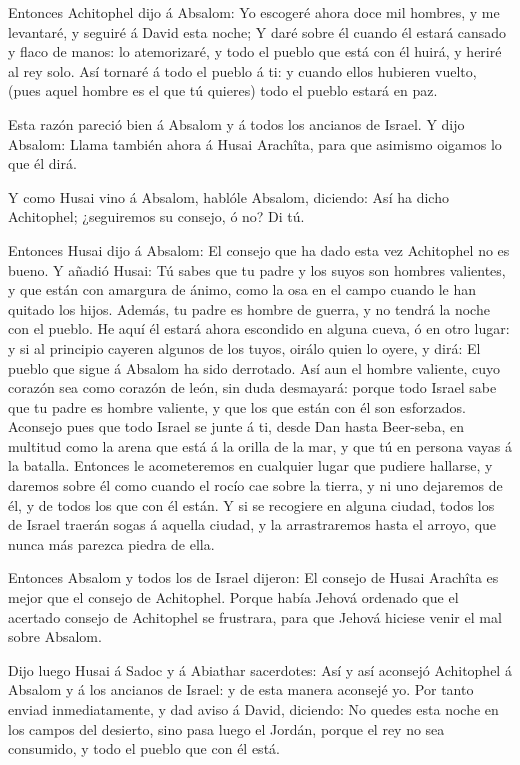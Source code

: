  Entonces Achitophel dijo á Absalom: Yo escogeré ahora doce
mil hombres, y me levantaré, y seguiré á David esta noche; 
Y daré sobre él cuando él estará cansado y flaco de manos: lo
atemorizaré, y todo el pueblo que está con él huirá, y heriré al rey
solo.  Así tornaré á todo el pueblo á ti: y cuando ellos
hubieren vuelto, (pues aquel hombre es el que tú quieres) todo el pueblo
estará en paz.

 Esta razón pareció bien á Absalom y á todos los ancianos de
Israel.  Y dijo Absalom: Llama también ahora á Husai
Arachîta, para que asimismo oigamos lo que él dirá.

 Y como Husai vino á Absalom, hablóle Absalom, diciendo: Así
ha dicho Achitophel; ¿seguiremos su consejo, ó no? Di tú.

 Entonces Husai dijo á Absalom: El consejo que ha dado esta
vez Achitophel no es bueno.  Y añadió Husai: Tú sabes que tu
padre y los suyos son hombres valientes, y que están con amargura de
ánimo, como la osa en el campo cuando le han quitado los hijos. Además,
tu padre es hombre de guerra, y no tendrá la noche con el pueblo.
 He aquí él estará ahora escondido en alguna cueva, ó en
otro lugar: y si al principio cayeren algunos de los tuyos, oirálo quien
lo oyere, y dirá: El pueblo que sigue á Absalom ha sido derrotado.
 Así aun el hombre valiente, cuyo corazón sea como corazón
de león, sin duda desmayará: porque todo Israel sabe que tu padre es
hombre valiente, y que los que están con él son esforzados.
 Aconsejo pues que todo Israel se junte á ti, desde Dan
hasta Beer-seba, en multitud como la arena que está á la orilla de la
mar, y que tú en persona vayas á la batalla.  Entonces le
acometeremos en cualquier lugar que pudiere hallarse, y daremos sobre él
como cuando el rocío cae sobre la tierra, y ni uno dejaremos de él, y de
todos los que con él están.  Y si se recogiere en alguna
ciudad, todos los de Israel traerán sogas á aquella ciudad, y la
arrastraremos hasta el arroyo, que nunca más parezca piedra de ella.

 Entonces Absalom y todos los de Israel dijeron: El consejo
de Husai Arachîta es mejor que el consejo de Achitophel. Porque había
Jehová ordenado que el acertado consejo de Achitophel se frustrara, para
que Jehová hiciese venir el mal sobre Absalom.

 Dijo luego Husai á Sadoc y á Abiathar sacerdotes: Así y
así aconsejó Achitophel á Absalom y á los ancianos de Israel: y de esta
manera aconsejé yo.  Por tanto enviad inmediatamente, y dad
aviso á David, diciendo: No quedes esta noche en los campos del
desierto, sino pasa luego el Jordán, porque el rey no sea consumido, y
todo el pueblo que con él está.

